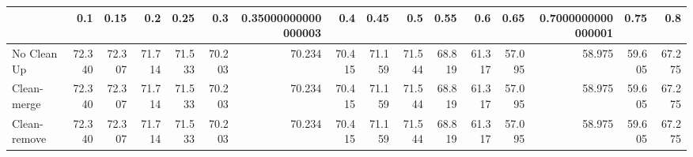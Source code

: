 \begin{tabular}{lrrrrrrrrrrrrrrr}
\toprule
{} &    0.1 &   0.15 &    0.2 &   0.25 &    0.3 & 0.35000000000000003 &    0.4 &   0.45 &    0.5 &   0.55 &    0.6 &   0.65 & 0.7000000000000001 &   0.75 &    0.8 \\
\midrule
No Clean Up  & 72.340 & 72.307 & 71.714 & 71.533 & 70.203 &              70.234 & 70.415 & 71.159 & 71.544 & 68.819 & 61.317 & 57.095 &             58.975 & 59.605 & 67.275 \\
Clean-merge  & 72.340 & 72.307 & 71.714 & 71.533 & 70.203 &              70.234 & 70.415 & 71.159 & 71.544 & 68.819 & 61.317 & 57.095 &             58.975 & 59.605 & 67.275 \\
Clean-remove & 72.340 & 72.307 & 71.714 & 71.533 & 70.203 &              70.234 & 70.415 & 71.159 & 71.544 & 68.819 & 61.317 & 57.095 &             58.975 & 59.605 & 67.275 \\
\bottomrule
\end{tabular}
